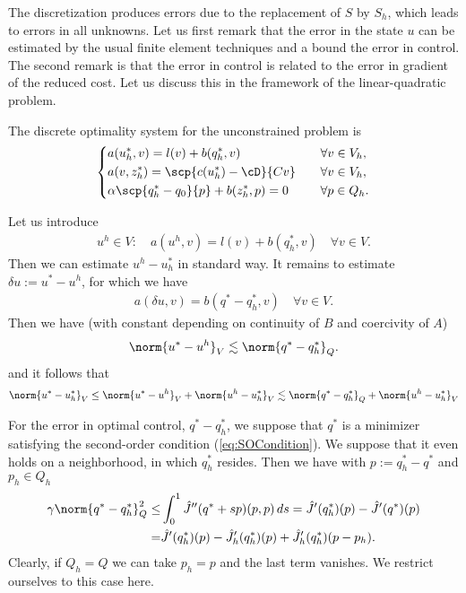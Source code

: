 The discretization produces errors due to the replacement of $S$ by $S_h$, which 
leads to errors in all unknowns. Let us first remark that the error in the state $u$ can be estimated by the usual finite element techniques and a bound the error in control.
The second remark is that the error in control is related to the error in gradient of the reduced cost.
Let us discuss this in the framework of the linear-quadratic problem.

\begin{example}[continues=example:LQ]
The discrete optimality system for the unconstrained problem is
%
\begin{equation}\label{eq:OSLQh}
%
\left\{
\begin{aligned}
&a(u^*_h,v) = l(v) + b(q^*_h,v)&\quad&\forall v\in V_h,\\
&a(v, z^*_h) = \scp{c(u^*_h)-\cD}{Cv}&\quad&\forall v\in V_h,\\
&\alpha\scp{q^*_h-q_0}{p}+b(z^*_h,p) =0&\quad&\forall p\in Q_h.
\end{aligned}
\right.
%
\end{equation}
\end{example}
%
Let us introduce
\begin{align*}
u^h\in V:\quad a(u^h, v) = l(v) + b(q^*_h,v)\quad \forall v\in V.
\end{align*}
Then we can estimate $u^h- u^*_h$ in standard way. It remains to estimate $\delta u :=u^*-u^h$, for which we have
\begin{align*}
a(\delta u, v) = b(q^*-q^*_h, v)\quad \forall v\in V.
\end{align*}
Then we have (with constant depending on continuity of $B$ and coercivity of $A$)
%
\begin{align*}
\norm{u^*-u^h}_V \lesssim \norm{q^*-q^*_h}_Q.
\end{align*}
%
and it follows that
%
\begin{align*}
\norm{u^*-u^*_h}_V \le \norm{u^*-u^h}_V + \norm{u^h-u^*_h}_V \lesssim \norm{q^*-q^*_h}_Q + \norm{u^h-u^*_h}_V
\end{align*}
%


For the error in optimal control, $q^*-q^*_h$, we suppose that $q^*$ is a minimizer satisfying the second-order condition (\ref{eq:SOCondition}). We suppose that it even holds on a neighborhood, in which $q^*_h$ resides. Then we have with $p:=q^*_h-q^*$ and $p_h\in Q_h$
%
\begin{align*}
\gamma \norm{q^*-q^*_h}^2_Q \le& \int_0^1\hat J''(q^* + sp)(p,p)\,ds = \hat J'(q^*_h)(p) - \hat J'(q^*)(p)\\ 
=& \hat J'(q^*_h)(p) - \hat J_h'(q^*_h)(p) +  \hat J_h'(q^*_h)(p-p_h).
\end{align*}
%
Clearly, if $Q_h=Q$ we can take $p_h=p$ and the last term vanishes.
We restrict ourselves to this case here.

